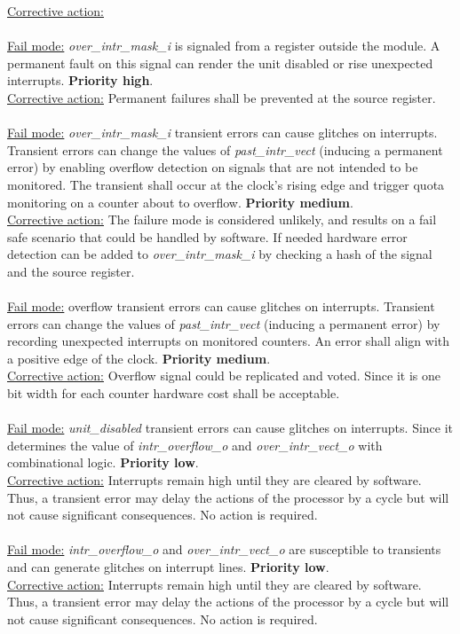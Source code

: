 \underline{Corrective action:}\\
\\
\underline{Fail mode:} \textit{over\_intr\_mask\_i} is signaled from a register outside the module. A permanent fault on this signal can render the unit disabled or rise unexpected interrupts. \textbf{ Priority high}.\\
\underline{Corrective action:} Permanent failures shall be prevented at the source register.\\
\\
\underline{Fail mode:} \textit{over\_intr\_mask\_i}  transient errors can cause glitches on interrupts. Transient errors can change the values of \textit{past\_intr\_vect} (inducing a permanent error) by enabling overflow detection on signals that are not intended to be monitored. The transient shall occur at the clock's rising edge and trigger quota monitoring on a counter about to overflow. \textbf{Priority medium}.\\
\underline{Corrective action:} The failure mode is considered unlikely, and results on a fail safe scenario that could be handled by software. If needed hardware error detection can be added to \textit{over\_intr\_mask\_i} by checking a hash of the signal and the source register.\\
\\
\underline{Fail mode:} overflow transient errors can cause glitches on interrupts. Transient errors can change the values of\textit{ past\_intr\_vect} (inducing a permanent error) by recording unexpected interrupts on monitored counters. An error shall align with a positive edge of the clock. \textbf{Priority medium}.\\
\underline{Corrective action:} Overflow signal could be replicated and voted. Since it is one bit width for each counter hardware cost shall be acceptable.\\
\\
\underline{Fail mode:} \textit{unit\_disabled} transient errors can cause glitches on interrupts. Since it determines the value of \textit{intr\_overflow\_o} and \textit{over\_intr\_vect\_o} with combinational logic. \textbf{Priority low}.\\
\underline{Corrective action:} Interrupts remain high until they are cleared by software. Thus, a transient error may delay the actions of the processor by a cycle but will not cause significant consequences. No action is required.\\
\\
\underline{Fail mode:} \textit{intr\_overflow\_o} and \textit{over\_intr\_vect\_o} are susceptible to transients and can generate glitches on interrupt lines. \textbf{Priority low}.\\
\underline{Corrective action:}  Interrupts remain high until they are cleared by software. Thus, a transient error may delay the actions of the processor by a cycle but will not cause significant consequences. No action is required.\\
\\
